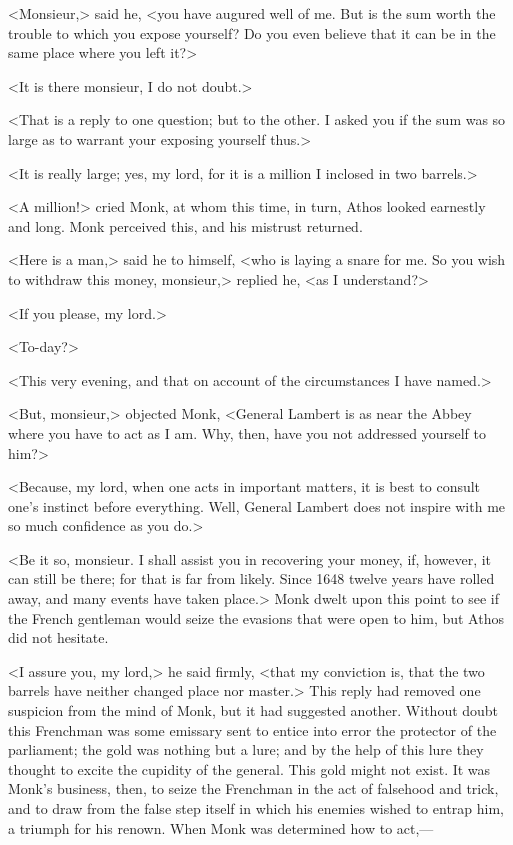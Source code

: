 <Monsieur,> said he, <you have augured well of me. But is the sum worth the trouble to which you expose yourself? Do you even believe that it can be in the same place where you left it?>

<It is there monsieur, I do not doubt.>

<That is a reply to one question; but to the other. I asked you if the sum was so large as to warrant your exposing yourself thus.>

<It is really large; yes, my lord, for it is a million I inclosed in two barrels.>

<A million!> cried Monk, at whom this time, in turn, Athos looked earnestly and long. Monk perceived this, and his mistrust returned.

<Here is a man,> said he to himself, <who is laying a snare for me. So you wish to withdraw this money, monsieur,> replied he, <as I understand?>

<If you please, my lord.>

<To-day?>

<This very evening, and that on account of the circumstances I have named.>

<But, monsieur,> objected Monk, <General Lambert is as near the Abbey where you have to act as I am. Why, then, have you not addressed yourself to him?>

<Because, my lord, when one acts in important matters, it is best to consult one's instinct before everything. Well, General Lambert does not inspire with me so much confidence as you do.>

<Be it so, monsieur. I shall assist you in recovering your money, if, however, it can still be there; for that is far from likely. Since 1648 twelve years have rolled away, and many events have taken place.> Monk dwelt upon this point to see if the French gentleman would seize the evasions that were open to him, but Athos did not hesitate.

<I assure you, my lord,> he said firmly, <that my conviction is, that the two barrels have neither changed place nor master.> This reply had removed one suspicion from the mind of Monk, but it had suggested another. Without doubt this Frenchman was some emissary sent to entice into error the protector of the parliament; the gold was nothing but a lure; and by the help of this lure they thought to excite the cupidity of the general. This gold might not exist. It was Monk's business, then, to seize the Frenchman in the act of falsehood and trick, and to draw from the false step itself in which his enemies wished to entrap him, a triumph for his renown. When Monk was determined how to act,—

